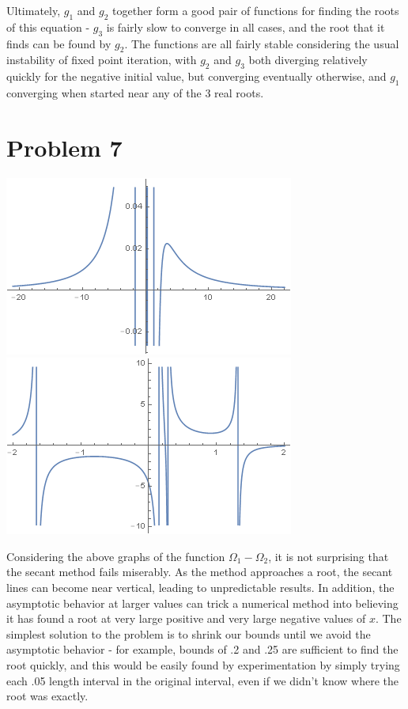 \documentclass[11pt]{article} %
\begin{document}
\par Ultimately, $g_1$ and $g_2$ together form a good pair of functions for finding the roots of this equation - $g_3$ is fairly slow to converge in all cases, and the root that it finds can be found by $g_2$. The functions are all fairly stable considering the usual instability of fixed point iteration, with $g_2$ and $g_3$ both diverging relatively quickly for the negative initial value, but converging eventually otherwise, and $g_1$ converging when started near any of the 3 real roots.
\section*{Problem 7}
\includegraphics[scale=.5]{plots/problem7plota.png}
\includegraphics[scale=.5]{plots/problem7plotb.png}
\par Considering the above graphs of the function $\Omega_1 - \Omega_2$, it is not surprising that the secant method fails
miserably. As the method approaches a root, the secant lines can become near vertical, leading to unpredictable results. In addition, the asymptotic behavior at larger values can trick a numerical method into believing it has found a root at very large positive and very large negative values of $x$.
	The simplest solution to the problem is to shrink our bounds until we avoid the asymptotic behavior - for example, bounds of .2 and .25 are sufficient to find the root quickly, and this would be easily found by experimentation by simply trying each .05 length interval in the original interval, even if we didn't  know where the root was exactly.
\end{document}
